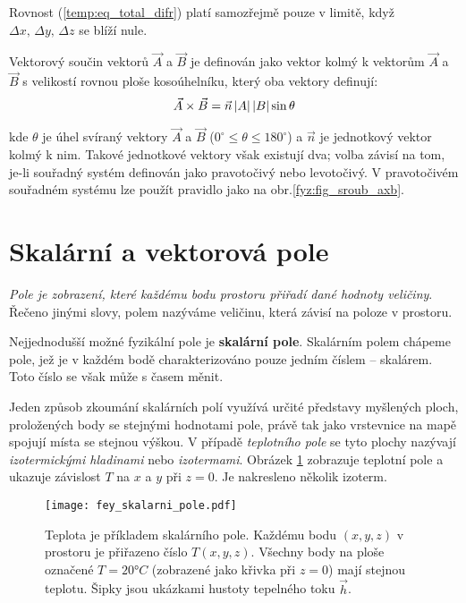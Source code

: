     Rovnost (\ref{temp:eq_total_difr}) platí samozřejmě pouze v limitě, když $\Delta x,\,\Delta 
    y,\,\Delta z$ se blíží nule.
   
    Vektorový součin vektorů $\vec{A}$ a $\vec{B}$ je definován jako vektor kolmý k vektorům 
    $\vec{A}$ a $\vec{B}$ s velikostí rovnou ploše kosoúhelníku, který oba vektory definují:
    \begin{equation}\label{eq_fyz:axb}
      \vec{A}\times\vec{B} = \vec{n}\left\lvert A\right\rvert\left\lvert B\right\rvert\sin\theta
    \end{equation} 

    kde $\theta$ je úhel svíraný vektory $\vec{A}$ a $\vec{B}$ ($0^\circ\leq\theta\leq180^\circ$) a 
    $\vec{n}$ je jednotkový vektor kolmý k nim. Takové jednotkové vektory však existují dva; volba 
    závisí na tom, je-li souřadný systém definován jako pravotočivý nebo levotočivý. V pravotočivém 
    souřadném systému lze použít pravidlo jako na obr.\ref{fyz:fig_sroub_axb}.
      
    \section{Skalární a vektorová pole}
      \cite[s.~29]{Feynman02} \emph{Pole je zobrazení, které každému bodu prostoru přiřadí dané 
      hodnoty veličiny}. Řečeno jinými slovy, polem nazýváme veličinu, která závisí na poloze v 
      prostoru.
      
      Nejjednodušší možné fyzikální pole je \textbf{ska\-lá\-rní pole}. Skalárním polem chápeme 
      pole, jež je v každém bodě charakterizováno pouze jedním číslem – skalárem. Toto číslo se však 
      může s časem měnit.
      
      Jeden způsob zkoumání skalár\-ních polí využívá určité představy myšle\-ných ploch, 
      pro\-ložených body se stejnými hodnotami pole, právě tak jako vrstevnice na mapě spojují místa 
      se stejnou výškou. V případě \emph{teplotního pole} se tyto plochy nazývají 
      \emph{izotermickými hladinami} nebo \emph{izotermami}. Obrázek \ref{fyz:fig_fey_skalar_pole} 
      zobrazuje teplotní pole a ukazuje závislost \(T\) na \(x\) a \(y\) při \(z = 0\). Je 
      nakresleno několik izoterm.

      \begin{figure}[ht!]
       \centering
       \texttt{[image: fey\_skalarni\_pole.pdf]}
       \caption{Teplota je příkladem skalárního pole. Každému bodu $(x,y,z)$ v prostoru je 
                přiřazeno číslo $T(x,y,z)$. Všechny body na ploše označené $T = 20°C$ (zobrazené 
                jako křivka při $z=0$) mají stejnou teplotu. Šipky jsou ukázkami hustoty tepelného 
                toku $\vec{h}$.}
       \label{fyz:fig_fey_skalar_pole} 
      \end{figure}
            
